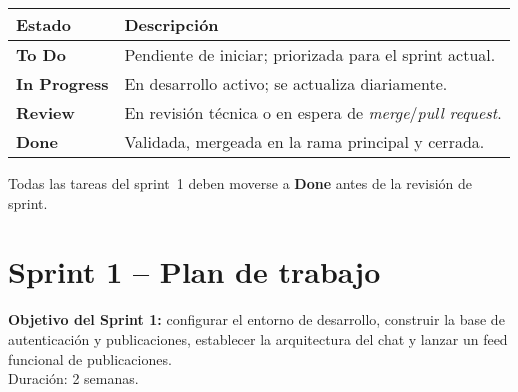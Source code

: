 \documentclass{article}
\begin{document}
\begin{tabular}{|p{}|p{}|}
\hline
\textbf{Estado} & \textbf{Descripci\'on} \\
\hline
\textbf{To Do} & Pendiente de iniciar; priorizada para el sprint actual. \\
\hline
\textbf{In Progress} & En desarrollo activo; se actualiza diariamente. \\
\hline
\textbf{Review} & En revisi\'on t\'ecnica o en espera de \emph{merge}/\emph{pull request}. \\
\hline
\textbf{Done} & Validada, mergeada en la rama principal y cerrada. \\
\hline
\end{tabular}

Todas las tareas del sprint~1 deben moverse a \textbf{Done} antes de la revisi\'on de sprint.

\section*{Sprint 1 – Plan de trabajo}
\textbf{Objetivo del Sprint 1:} configurar el entorno de desarrollo, construir la base de autenticaci\'on y publicaciones, establecer la arquitectura del chat y lanzar un feed funcional de publicaciones. \\
Duraci\'on: 2 semanas.
\end{document}
